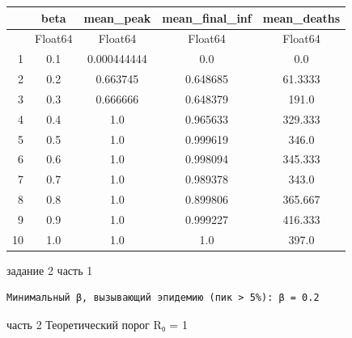 \documentclass[
  12pt,
  a4paper,
  DIV=11,
  numbers=noendperiod]{scrreprt}
\newenvironment{Shaded}{\begin{snugshade}}{\end{snugshade}}
\newcommand{\CommentTok}[1]{\textcolor[rgb]{0.37,0.37,0.37}{#1}}
\newcommand{\ConstantTok}[1]{\textcolor[rgb]{0.56,0.35,0.01}{#1}}
\newcommand{\ControlFlowTok}[1]{\textcolor[rgb]{0.00,0.23,0.31}{#1}}
\newcommand{\FloatTok}[1]{\textcolor[rgb]{0.68,0.00,0.00}{#1}}
\newcommand{\FunctionTok}[1]{\textcolor[rgb]{0.28,0.35,0.67}{#1}}
\newcommand{\KeywordTok}[1]{\textcolor[rgb]{0.00,0.23,0.31}{#1}}
\newcommand{\NormalTok}[1]{\textcolor[rgb]{0.00,0.23,0.31}{#1}}
\newcommand{\OperatorTok}[1]{\textcolor[rgb]{0.37,0.37,0.37}{#1}}
\newcommand{\SpecialCharTok}[1]{\textcolor[rgb]{0.37,0.37,0.37}{#1}}
\newcommand{\StringTok}[1]{\textcolor[rgb]{0.13,0.47,0.30}{#1}}
\begin{document}
\begin{tabular}{r|cccc}
    & beta & mean\_peak & mean\_final\_inf & mean\_deaths\\
    \hline
    & Float64 & Float64 & Float64 & Float64\\
    \hline
    1 & 0.1 & 0.000444444 & 0.0 & 0.0 \\
    2 & 0.2 & 0.663745 & 0.648685 & 61.3333 \\
    3 & 0.3 & 0.666666 & 0.648379 & 191.0 \\
    4 & 0.4 & 1.0 & 0.965633 & 329.333 \\
    5 & 0.5 & 1.0 & 0.999619 & 346.0 \\
    6 & 0.6 & 1.0 & 0.998094 & 345.333 \\
    7 & 0.7 & 1.0 & 0.989378 & 343.0 \\
    8 & 0.8 & 1.0 & 0.899806 & 365.667 \\
    9 & 0.9 & 1.0 & 0.999227 & 416.333 \\
    10 & 1.0 & 1.0 & 1.0 & 397.0 \\
\end{tabular}

задание 2 часть 1

\begin{Shaded}
\end{Shaded}

\begin{verbatim}
Минимальный β, вызывающий эпидемию (пик > 5%): β = 0.2
\end{verbatim}

часть 2 Теоретический порог R₀ = 1

\begin{Shaded}
\end{Shaded}
\end{document}
